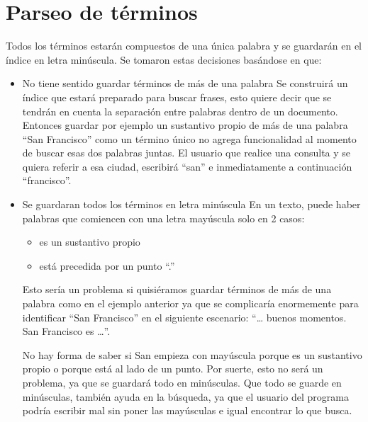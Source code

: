 
\section{Parseo de términos}
 
Todos  los términos estarán compuestos de una única palabra y se guardarán en el índice en letra minúscula. Se tomaron estas decisiones  basándose en que:
\begin{itemize}


\item No tiene sentido guardar términos de más de una palabra
Se construirá un índice que estará preparado para buscar frases, esto quiere decir que se tendrán en cuenta la separación entre palabras dentro de un documento. Entonces guardar por ejemplo un sustantivo propio de más de una palabra “San Francisco” como un término único no agrega funcionalidad al momento de buscar esas dos palabras juntas. El usuario que realice una consulta y se quiera referir a esa ciudad, escribirá “san” e inmediatamente a continuación “francisco”.

\item Se guardaran todos los términos en letra minúscula
En un texto, puede haber palabras que comiencen con una letra mayúscula solo en 2 casos:

\begin{itemize}
\item es un sustantivo propio
\item   está precedida por un punto “.”
\end{itemize}

Esto sería un problema si quisiéramos guardar términos de más de una palabra como en el ejemplo anterior ya que se complicaría enormemente para identificar “San Francisco” en el siguiente escenario: “… buenos momentos. San Francisco es …”.

No hay forma de saber si San empieza con mayúscula porque es un sustantivo propio o porque está al lado de un punto. Por suerte, esto no será un problema, ya que se guardará todo en minúsculas.
Que todo se guarde en minúsculas, también ayuda en la búsqueda, ya que el usuario del programa podría escribir mal sin poner las mayúsculas e igual encontrar lo que busca.

\end{itemize}
 
